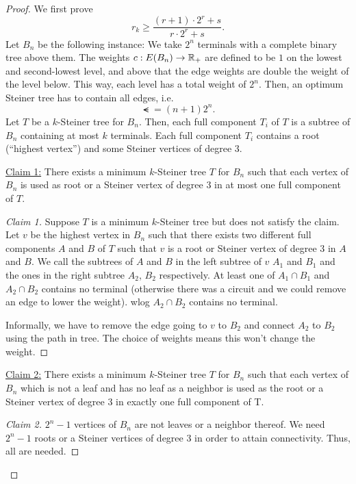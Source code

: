 \documentclass[../skript.tex]{subfiles}
\begin{document}
\begin{proof}
We first prove
\[
r_k \geq \frac{(r+1) \cdot 2^r + s}{r \cdot 2^r + s}.
\]
Let $B_n$ be the following instance: We take $2^n$ terminals with a complete binary tree above them. The weights $c : E(B_n) \to \mathbb{R}_+$ are defined to be $1$ on the lowest and second-lowest level, and above that the edge weights are double the weight of the level below. This way, each level has a total weight of $2^n$.
Then, an optimum Steiner tree has to contain all edges, i.e.
\[
	\smt = (n+1) 2^n.
\]
Let $T$ be a $k$-Steiner tree for $B_n$. Then, each full component $T_i$ of $T$ is a subtree of $B_n$ containing at most $k$ terminals. Each full component $T_i$ contains a root (``highest vertex'') and some Steiner vertices of degree 3.

\underline{Claim 1:} There exists a minimum $k$-Steiner tree $T$ for $B_n$ such that each vertex of $B_n$ is used as root or a Steiner vertex of degree 3 in at most one full component of $T$.
\begin{proof}[Claim 1]
Suppose $T$ is a minimum $k$-Steiner tree but does not satisfy the claim. Let $v$ be the highest vertex in $B_n$ such that there exists two different full components $A$ and $B$ of $T$ such that $v$ is a root or Steiner vertex of degree 3 in $A$ and $B$. We call the subtrees of $A$ and $B$ in the left subtree of $v$ $A_1$ and $B_1$ and the ones in the right subtree $A_2$, $B_2$ respectively.
At least one of $A_1 \cap B_1$ and $A_2 \cap B_2$ contains no terminal (otherwise there was a circuit and we could remove an edge to lower the weight).
\ac{wlog} $A_2 \cap B_2$ contains no terminal.

Informally, we have to remove the edge going to $v$ to $B_2$ and connect $A_2$ to $B_2$ using the path in tree. The choice of weights means this won't change the weight.
\end{proof}
\underline{Claim 2:} There exists a minimum $k$-Steiner tree $T$ for $B_n$ such that each vertex of $B_n$ which is not a leaf and has no leaf as a neighbor is used as the root or a Steiner vertex of degree 3 in exactly one full component of T.
\begin{proof}[Claim 2]
$2^n -1$ vertices of $B_n$ are not leaves or a neighbor thereof. We need $2^n - 1$ roots or a Steiner vertices of degree 3 in order to attain connectivity. Thus, all are needed.


\end{proof}
\end{proof}
\end{document}
